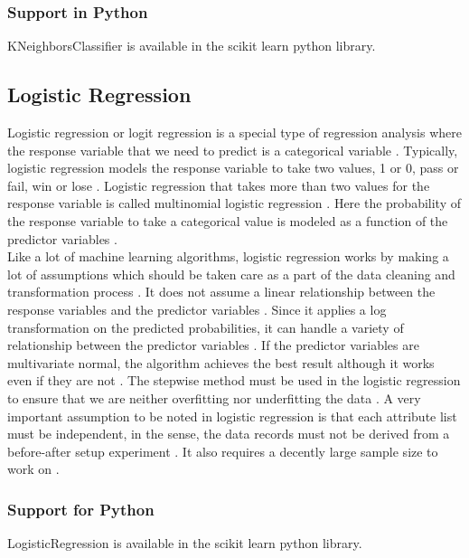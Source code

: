 \documentclass[sigconf]{acmart}
\begin{document}
\subsubsection{Support in Python} 
KNeighborsClassifier is available in the scikit learn python library. 

\subsection{Logistic Regression}
Logistic regression or logit regression is a special type of regression analysis where the response variable that we need to predict is a categorical variable \cite{book-tan}. Typically, logistic regression models the response variable to take two values, 1 or 0, pass or fail, win or lose \cite{book-tan}. Logistic regression that takes more than two values for the response variable is called multinomial logistic regression \cite{book-tan}. Here the probability of the response variable to take a categorical value is modeled as a function of the predictor variables \cite{book-tan}. \\

Like a lot of machine learning algorithms, logistic regression works by making a lot of assumptions which should be taken care as a part of the data cleaning and transformation process \cite{book-shai}. It does not assume a linear relationship between the response variables and the predictor variables \cite{book-shai}. Since it applies a log transformation on the predicted probabilities, it can handle a variety of relationship between the predictor variables \cite{book-shai}. If the predictor variables are multivariate normal, the algorithm achieves the best result although it works even if they are not \cite{book-shai}. The stepwise method must be used in the logistic regression to ensure that we are neither overfitting nor underfitting the data \cite{book-shai}. A very important assumption to be noted in logistic regression is that each attribute list must be independent, in the sense, the data records must not be derived from a before-after setup experiment \cite{book-shai}. It also requires a decently large sample size to work on \cite{book-shai}. 

\subsubsection{Support for Python} LogisticRegression is available in the scikit learn python library.
\end{document}
